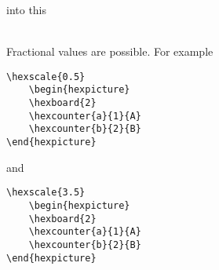 \documentclass[a4paper,12pt]{article}
\begin{document}
    \begin{hexpicture}
    \end{hexpicture}

    into this\\
    
    \begin{hexpicture}
    \end{hexpicture}\\
    
    Fractional values are possible. For example
    
    \begin{verbatim}\hexscale{0.5}
    \begin{hexpicture}
    \hexboard{2}
    \hexcounter{a}{1}{A}
    \hexcounter{b}{2}{B}
\end{hexpicture}\end{verbatim}
    
    \begin{hexpicture}
    \end{hexpicture}

    and

    \begin{verbatim}\hexscale{3.5}
    \begin{hexpicture}
    \hexboard{2}
    \hexcounter{a}{1}{A}
    \hexcounter{b}{2}{B}
\end{hexpicture}\end{verbatim}
    
    \begin{hexpicture}
    \end{hexpicture}

    
\end{document}
